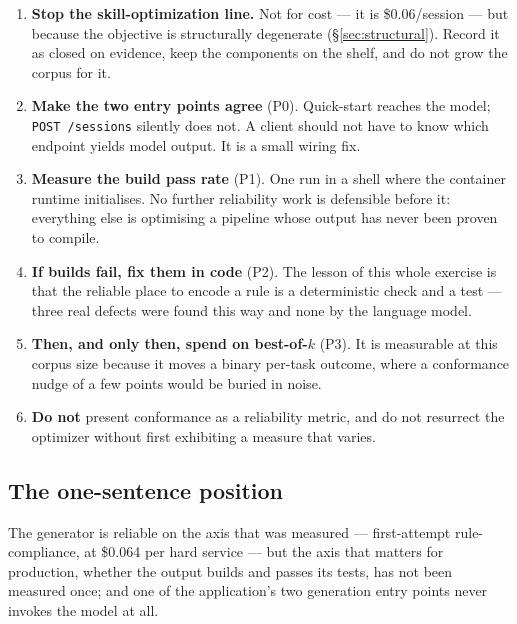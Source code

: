 \documentclass[11pt,a4paper]{article}
\begin{document}
\begin{enumerate}[leftmargin=1.4em]
  \item \textbf{Stop the skill-optimization line.} Not for cost --- it is
  \$0.06/session --- but because the objective is structurally degenerate
  (\S\ref{sec:structural}). Record it as closed on evidence, keep the components on
  the shelf, and do not grow the corpus for it.
  \item \textbf{Make the two entry points agree} (P0). Quick-start reaches the
  model; \texttt{POST /sessions} silently does not. A client should not have to know
  which endpoint yields model output. It is a small wiring fix.
  \item \textbf{Measure the build pass rate} (P1). One run in a shell where the
  container runtime initialises. No further reliability work is defensible before it:
  everything else is optimising a pipeline whose output has never been proven to
  compile.
  \item \textbf{If builds fail, fix them in code} (P2). The lesson of this whole
  exercise is that the reliable place to encode a rule is a deterministic check and a
  test --- three real defects were found this way and none by the language model.
  \item \textbf{Then, and only then, spend on best-of-$k$} (P3). It is measurable at
  this corpus size because it moves a binary per-task outcome, where a conformance
  nudge of a few points would be buried in noise.
  \item \textbf{Do not} present conformance as a reliability metric, and do not
  resurrect the optimizer without first exhibiting a measure that varies.
\end{enumerate}

\subsection*{The one-sentence position}

The generator is reliable on the axis that was measured --- first-attempt
rule-compliance, at \$0.064 per hard service --- but the axis that matters for
production, whether the output builds and passes its tests, has not been measured
once; and one of the application's two generation entry points never invokes the model
at all.
\end{document}
